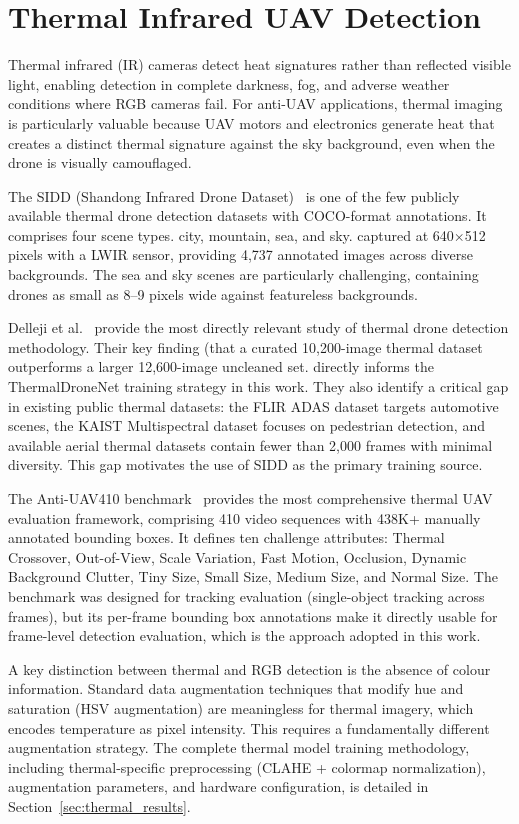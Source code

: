 \documentclass[12pt,a4paper]{report}
\begin{document}
\section{Thermal Infrared UAV Detection}

Thermal infrared (IR) cameras detect heat signatures rather than reflected
visible light, enabling detection in complete darkness, fog, and adverse
weather conditions where RGB cameras fail. For anti-UAV applications,
thermal imaging is particularly valuable because UAV motors and electronics
generate heat that creates a distinct thermal signature against the sky
background, even when the drone is visually camouflaged.

The SIDD (Shandong Infrared Drone Dataset)~\cite{sidd2023} is one of the
few publicly available thermal drone detection datasets with COCO-format
annotations. It comprises four scene types. city, mountain, sea, and
sky. captured at 640$\times$512 pixels with a LWIR sensor, providing
4,737 annotated images across diverse backgrounds. The sea and sky scenes
are particularly challenging, containing drones as small as 8--9 pixels
wide against featureless backgrounds.

Delleji et al.~\cite{delleji2025thermal} provide the most directly relevant
study of thermal drone detection methodology. Their key finding (that a
curated 10,200-image thermal dataset outperforms a larger 12,600-image
uncleaned set. directly informs the ThermalDroneNet training strategy in
this work. They also identify a critical gap in existing public thermal
datasets: the FLIR ADAS dataset targets automotive scenes, the KAIST
Multispectral dataset focuses on pedestrian detection, and available aerial
thermal datasets contain fewer than 2,000 frames with minimal diversity.
This gap motivates the use of SIDD as the primary training source.

The Anti-UAV410 benchmark~\cite{antiuav410_2023} provides the most
comprehensive thermal UAV evaluation framework, comprising 410 video
sequences with 438K+ manually annotated bounding boxes. It defines ten
challenge attributes: Thermal Crossover, Out-of-View, Scale Variation,
Fast Motion, Occlusion, Dynamic Background Clutter, Tiny Size, Small Size,
Medium Size, and Normal Size. The benchmark was designed for tracking
evaluation (single-object tracking across frames), but its per-frame
bounding box annotations make it directly usable for frame-level detection
evaluation, which is the approach adopted in this work.

A key distinction between thermal and RGB detection is the absence of
colour information. Standard data augmentation techniques that modify
hue and saturation (HSV augmentation) are meaningless for thermal imagery,
which encodes temperature as pixel intensity. This requires a fundamentally
different augmentation strategy. The complete thermal model training
methodology, including thermal-specific preprocessing (CLAHE + colormap
normalization), augmentation parameters, and hardware configuration, is
detailed in Section~\ref{sec:thermal_results}.
\end{document}
